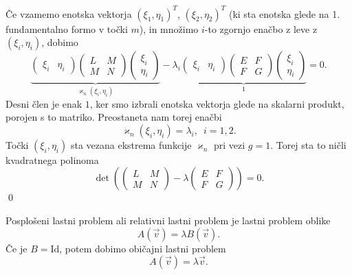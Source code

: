     Če vzamemo enotska vektorja $(\xi_1, \eta_1)^{T}$, $(\xi_2, \eta_2)^{T}$ (ki sta enotska glede na 1. fundamentalno formo v točki $m$), in množimo $i$-to zgornjo enačbo z leve z $(\xi_i, \eta_i)$, 
    dobimo 
    \begin{equation*}
        \underbrace{\begin{pmatrix}
            \xi_i & \eta_i
        \end{pmatrix}
            \begin{pmatrix}
          L & M \\
          M & N
          \end{pmatrix}\begin{pmatrix}
            \xi_i \\
            \eta_i
        \end{pmatrix}}_{\varkappa_n(\xi_i, \eta_i)}    - \lambda_i 
        \underbrace{\begin{pmatrix}
            \xi_i & \eta_i
        \end{pmatrix}
        \begin{pmatrix}
        E & F \\
        F & G
        \end{pmatrix} \begin{pmatrix}
            \xi_i \\
            \eta_i
        \end{pmatrix}}_1  =  0.
     \end{equation*}
     Desni člen je enak $1$, ker smo izbrali enotska vektorja glede na skalarni produkt, porojen s to matriko. Preostaneta nam torej enačbi \begin{equation*}
       \varkappa_n(\xi_i, \eta_i) = \lambda_i, \,\,\, i = 1,2.
     \end{equation*}  
     Točki $(\xi_i, \eta_i)$ sta vezana ekstrema funkcije $\varkappa_n$ pri vezi $g = 1$. Torej sta to ničli kvadratnega polinoma
     \begin{equation*}
        \det \left( 
         \begin{pmatrix}
       L & M \\
       M & N
       \end{pmatrix}  - \lambda \begin{pmatrix}
     E & F \\
     F & G
     \end{pmatrix} \right) = 0.
      \end{equation*} 
\qed

\begin{definicija}
\label{def_posploseni_lastni_problem}
 Posplošeni lastni problem ali relativni lastni problem je lastni problem oblike \begin{equation*}
   A(\vec{v}) = \lambda B(\vec{v}).
 \end{equation*}  
  Če je $B = \text{Id}$, potem dobimo običajni lastni problem \begin{equation*}
    A(\vec{v}) = \lambda \vec{v}.
  \end{equation*}  
\end{definicija}

